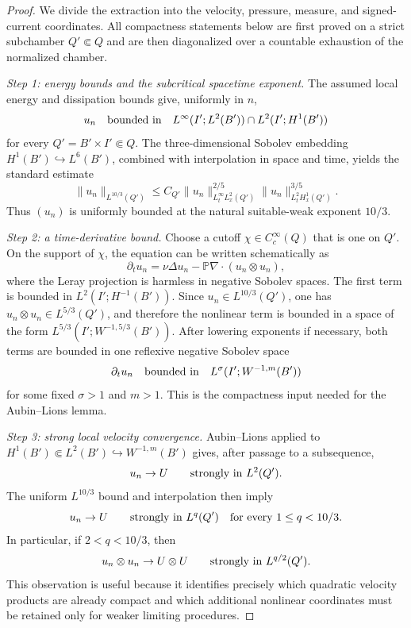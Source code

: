 \documentclass[10pt,a4paper]{amsart}
\begin{document}
\begin{proof}
We divide the extraction into the velocity, pressure, measure, and signed-current
coordinates.  All compactness statements below are first proved on a strict
subchamber \(Q'\Subset Q\) and are then diagonalized over a countable exhaustion
of the normalized chamber.

\emph{Step 1: energy bounds and the subcritical spacetime exponent.}
The assumed local energy and dissipation bounds give, uniformly in \(n\),
\[
 u_n\quad\hbox{bounded in}\quad
 L^\infty(I';L^2(B'))\cap L^2(I';H^1(B'))
\]
for every \(Q'=B'\times I'\Subset Q\).  The three-dimensional Sobolev
embedding \(H^1(B')\hookrightarrow L^6(B')\), combined with interpolation in
space and time, yields the standard estimate
\[
 \|u_n\|_{L^{10/3}(Q')}
 \le C_{Q'}
 \|u_n\|_{L^\infty_tL^2_x(Q')}^{2/5}
 \|u_n\|_{L^2_tH^1_x(Q')}^{3/5}.
\]
Thus \((u_n)\) is uniformly bounded at the natural suitable-weak exponent
\(10/3\).

\emph{Step 2: a time-derivative bound.}
Choose a cutoff \(\chi\in C_c^\infty(Q)\) that is one on \(Q'\).  On the support
of \(\chi\), the equation can be written schematically as
\[
 \partial_t u_n
 =\nu\Delta u_n-\mathbb P\nabla\!\cdot(u_n\otimes u_n),
\]
where the Leray projection is harmless in negative Sobolev spaces.  The first
term is bounded in \(L^2(I';H^{-1}(B'))\).  Since
\(u_n\in L^{10/3}(Q')\), one has
\(u_n\otimes u_n\in L^{5/3}(Q')\), and therefore the nonlinear term is bounded
in a space of the form
\(L^{5/3}(I';W^{-1,5/3}(B'))\).  After lowering exponents if necessary, both
terms are bounded in one reflexive negative Sobolev space
\[
 \partial_tu_n\quad\hbox{bounded in}\quad
 L^\sigma(I';W^{-1,m}(B'))
\]
for some fixed \(\sigma>1\) and \(m>1\).  This is the compactness input needed
for the Aubin--Lions lemma.

\emph{Step 3: strong local velocity convergence.}
Aubin--Lions applied to
\(H^1(B')\Subset L^2(B')\hookrightarrow W^{-1,m}(B')\) gives, after passage to
a subsequence,
\[
 u_n\to U\qquad\hbox{strongly in }L^2(Q').
\]
The uniform \(L^{10/3}\) bound and interpolation then imply
\[
 u_n\to U\qquad\hbox{strongly in }L^q(Q')
 \quad\text{for every }1\le q<10/3.
\]
In particular, if \(2<q<10/3\), then
\[
 u_n\otimes u_n\to U\otimes U
 \qquad\hbox{strongly in }L^{q/2}(Q').
\]
This observation is useful because it identifies precisely which quadratic
velocity products are already compact and which additional nonlinear
coordinates must be retained only for weaker limiting procedures.


\end{proof}
\end{document}
